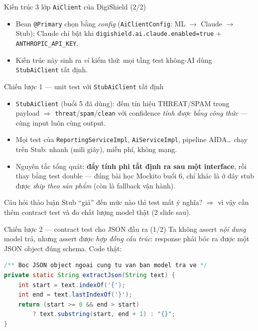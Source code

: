 \documentclass[aspectratio=169,12pt]{beamer}
\begin{document}
\begin{frame}{Kiến trúc 3 lớp \texttt{AiClient} của DigiShield (2/2)}
  \small
  \begin{itemize}
    \item Bean \texttt{@Primary} chọn bằng \emph{config} (\texttt{AiClientConfig}: ML $\rightarrow$ Claude $\rightarrow$ Stub); Claude chỉ bật khi \texttt{digishield.ai.claude.enabled=true} + \texttt{ANTHROPIC\_API\_KEY}.
    \item Kiến trúc này sinh ra \emph{vì} kiểm thử: mọi tầng test không-AI dùng \texttt{StubAiClient} tất định.
  \end{itemize}
\end{frame}

\begin{frame}{Chiến lược 1 --- unit test với \texttt{StubAiClient} tất định}
  \begin{itemize}
    \item \texttt{StubAiClient} (buổi 5 đã dùng): đếm tín hiệu THREAT/SPAM trong payload $\Rightarrow$ \texttt{threat}/\texttt{spam}/\texttt{clean} với confidence \emph{tính được bằng công thức} --- cùng input luôn cùng output.
    \item Mọi test của \texttt{ReportingServiceImpl}, \texttt{AiServiceImpl}, pipeline AIDA\ldots{} chạy trên Stub: nhanh (mili giây), miễn phí, không mạng.
    \item Nguyên tắc tổng quát: \textbf{đẩy tính phi tất định ra sau một interface}, rồi thay bằng test double --- đúng bài học Mockito buổi 6, chỉ khác là ở đây stub được \emph{ship theo sản phẩm} (còn là fallback vận hành).
  \end{itemize}
  \begin{block}{Câu hỏi thảo luận}
    Stub ``giả'' đến mức nào thì test mất ý nghĩa? $\Rightarrow$ vì vậy cần thêm contract test và đo chất lượng model thật (2 slide sau).
  \end{block}
\end{frame}

\begin{frame}[fragile]{Chiến lược 2 --- contract test cho JSON đầu ra (1/2)}
  \small Ta không assert \emph{nội dung} model trả, nhưng assert được \emph{hợp đồng cấu trúc}: response phải bóc ra được một JSON object đúng schema. Code thật:
\begin{lstlisting}[language=java,basicstyle=\ttfamily\scriptsize]
/** Boc JSON object ngoai cung tu van ban model tra ve */
private static String extractJson(String text) {
    int start = text.indexOf('{');
    int end = text.lastIndexOf('}');
    return (start >= 0 && end > start)
        ? text.substring(start, end + 1) : "{}";
}
\end{lstlisting}
\end{frame}
\end{document}
